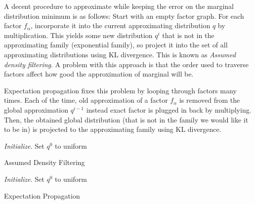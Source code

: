 \documentclass[12pt]{article}
\begin{document}
A decent procedure to approximate while keeping the error on the marginal distribution minimum is as follows: Start with an empty factor graph. For each factor $f_\alpha$, incorporate it into the current approximating distribution $q$ by multiplication. This yields some new distribution $q^i$ that is not in the approximating family (exponential family), so project it into the set of all approximating distributions using KL divergence. This is known as \textit{Assumed density filtering}. A problem with this approach is that the order used to traverse factors affect how good the approximation of marginal will be.

Expectation propagation fixes this problem by looping through factors many times. Each of the time, old approximation of a factor $f_\alpha$ is removed from the global approximation $q^{i-1}$ instead exact factor is plugged in back by multiplying. Then, the obtained global distribution (that is not in the family we would like it to be in) is projected to the approximating family using KL divergence.
\clearpage
\begin{algorithm}[H]
	\textit{Initialize}. Set $q^0$ to uniform
	\caption{Assumed Density Filtering}
	\label{adf}
\end{algorithm} \vspace{5mm}

\begin{algorithm}[H]
	\textit{Initialize}. Set $q^0$ to uniform \\
	\caption{Expectation Propagation}
	\label{ep}
\end{algorithm}
\end{document}
